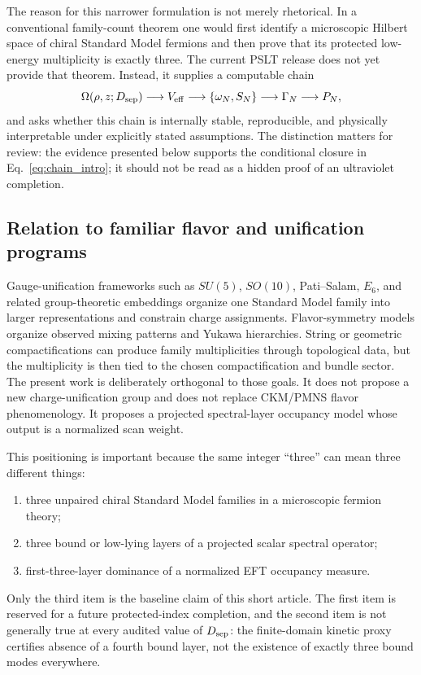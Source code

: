 \documentclass[11pt,a4paper]{article}
\newcommand{\Dsep}{D_{\rm sep}}
\begin{document}
The reason for this narrower formulation is not merely rhetorical.
In a conventional family-count theorem one would first identify a microscopic Hilbert space of chiral Standard Model fermions and then prove that its protected low-energy multiplicity is exactly three.
The current PSLT release does not yet provide that theorem.
Instead, it supplies a computable chain
\begin{equation}
    \Omega(\rho,z;\Dsep)
    \longrightarrow
    V_{\rm eff}
    \longrightarrow
    \{\omega_N,S_N\}
    \longrightarrow
    \Gamma_N
    \longrightarrow
    P_N,
    \label{eq:chain_intro}
\end{equation}
and asks whether this chain is internally stable, reproducible, and physically interpretable under explicitly stated assumptions.
The distinction matters for review: the evidence presented below supports the conditional closure in Eq.~\eqref{eq:chain_intro}; it should not be read as a hidden proof of an ultraviolet completion.

\subsection{Relation to familiar flavor and unification programs}

Gauge-unification frameworks such as \(SU(5)\), \(SO(10)\), Pati--Salam, \(E_6\), and related group-theoretic embeddings organize one Standard Model family into larger representations and constrain charge assignments.
Flavor-symmetry models organize observed mixing patterns and Yukawa hierarchies.
String or geometric compactifications can produce family multiplicities through topological data, but the multiplicity is then tied to the chosen compactification and bundle sector.
The present work is deliberately orthogonal to those goals.
It does not propose a new charge-unification group and does not replace CKM/PMNS flavor phenomenology.
It proposes a projected spectral-layer occupancy model whose output is a normalized scan weight.

This positioning is important because the same integer ``three'' can mean three different things:
\begin{enumerate}
    \item three unpaired chiral Standard Model families in a microscopic fermion theory;
    \item three bound or low-lying layers of a projected scalar spectral operator;
    \item first-three-layer dominance of a normalized EFT occupancy measure.
\end{enumerate}
Only the third item is the baseline claim of this short article.
The first item is reserved for a future protected-index completion, and the second item is not generally true at every audited value of \(\Dsep\): the finite-domain kinetic proxy certifies absence of a fourth bound layer, not the existence of exactly three bound modes everywhere.
\end{document}
